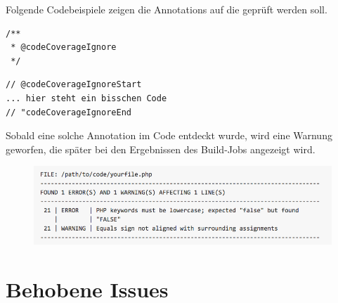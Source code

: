 \documentclass[11pt,a4paper]{article} %
\begin{document}
Folgende Codebeispiele zeigen die Annotations auf die geprüft werden soll.

\begin{lstlisting} 
/**
 * @codeCoverageIgnore
 */
\end{lstlisting} \label{codeCoverageIgnore}

\begin{lstlisting} 
// @codeCoverageIgnoreStart
... hier steht ein bisschen Code
// "codeCoverageIgnoreEnd
\end{lstlisting} \label{codeCoverageIgnore2}

Sobald eine solche Annotation im Code entdeckt wurde, wird eine Warnung geworfen, die später
bei den Ergebnissen des Build-Jobs angezeigt wird.

\begin{figure}[h]
\includegraphics[width=\textwidth]{images/snifferResult.png}
\centering
\end{figure}

\section{Behobene Issues} \label{sec:issues}

\newpage
\end{document}
